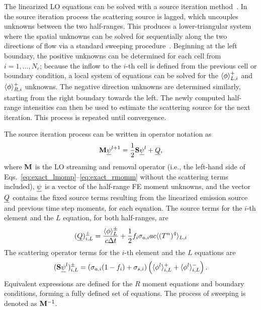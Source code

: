 The linearized LO equations can be solved with a source iteration
method~\cite{lewis,morel_dsa,mcclarren_notes}.  In the source iteration
process the scattering source is lagged, which
uncouples unknowns between the two half-ranges.  This produces a lower-triangular
system where the spatial unknowns can be solved for sequentially along the two directions of flow via a
standard sweeping procedure~\cite{lewis,morel_ldtrt}.  Beginning at the left boundary, the
positive unknowns can be determined for each cell from $i=1,\ldots,N_c$; because the
inflow to the $i$-th cell is defined from the previous cell or boundary condition, a local system
of equations can be solved for the $\langle \phi \rangle_{L,i}^+$ and $\langle \phi \rangle_{R,i}^+$ unknowns.
The negative direction unknowns are
determined similarly, starting from the
right boundary towards the left.  The newly computed half-range
intensities can then be used to estimate the scattering source for the next iteration.  This
process is repeated until convergence.  

The source iteration process can be written in operator notation as
\begin{equation}
    \mathbf{M} \underline{\psi}^{l+1} = \frac{1}{2}\mathbf{S}\underline{\psi}^{l} + \underline{Q},
\end{equation}
where $\mathbf{M}$ is the LO streaming and removal operator (i.e., the left-hand side of
Eqs.~\eqref{eq:exact_lmomp}--\eqref{eq:exact_rmomm} without the scattering terms
included), $\underline{\psi}$ is a vector of the half-range FE moment unknowns, and the vector
$\underline{Q}$ contains the fixed source terms resulting from the linearized emission source and previous
time step moments, for each equation.  The source terms for the $i$-th element and the $L$
equation, for both half-ranges, are
\begin{equation}
    (\underline{Q})_{i,L}^\pm = \frac{\langle \phi \rangle_L^\pm}{c\Delta t} + \frac{1}{2}f_i \sigma_{a,i} a c \langle 
        (T^{n})^4 \rangle_{L,i}
\end{equation}
The scattering operator terms for the $i$-th element and the $L$ equations are
\begin{equation}
    (\mathbf{S} \underline{\psi}^l)^{\pm}_{i,L} = \left(\sigma_{a,i} (1-f_i) + \sigma_{s,i}\right)
    \left(\langle  \phi^l \rangle_{i,L}^+ + \langle  \phi^l \rangle_{i,L}^-\right).
\end{equation}
Equivalent expressions are defined for the $R$ moment equations and boundary conditions,
forming a fully defined set of equations.  The process of sweeping is denoted as $\mathbf{M}^{-1}$.

